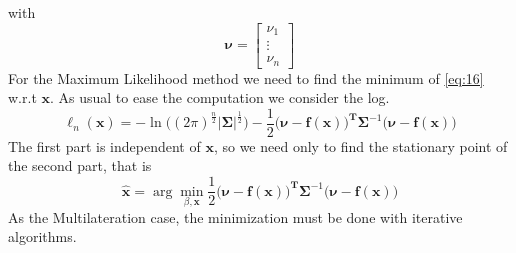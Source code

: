 \documentclass[12pt,twoside]{report}
\begin{document}
with 
\begin{equation}
    \boldsymbol{\nu}=\begin{bmatrix}
    \nu_1\\
    \vdots\\
    \nu_n
    \end{bmatrix}
\end{equation}
For the Maximum Likelihood method we need to find the minimum of \ref{eq:16} w.r.t $\mathbf{x}$. As usual to ease the computation we consider the log. 
\begin{equation}
    \ell_n(\mathbf{x})=-\ln\big((2\pi)^{\frac{n}{2}}|\boldsymbol{\Sigma}|^{\frac{1}{2}}\big)-\frac{1}{2}\big(\boldsymbol{\nu}-\mathbf{f}(\mathbf{x})\big)^\mathbf{T}\boldsymbol{\Sigma}^{-1}\big(\boldsymbol{\nu}-\mathbf{f}(\mathbf{x})\big)
\end{equation}
The first part is independent of $\mathbf{x}$, so we need only to find the stationary point of the second part, that is 
\begin{equation}
\hat{\mathbf{x}}=\arg \min_{\beta,\mathbf{x}}\frac{1}{2}\big(\boldsymbol{\nu}-\mathbf{f}(\mathbf{x})\big)^\mathbf{T}\boldsymbol{\Sigma}^{-1}\big(\boldsymbol{\nu}-\mathbf{f}(\mathbf{x})\big)
\end{equation}
As the Multilateration case, the minimization must be done with iterative algorithms.

\clearpage
\end{document}

